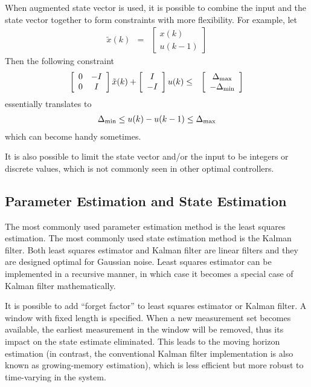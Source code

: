When augmented state vector is used, it is possible to combine the input and the state vector together to form constraints with more flexibility. For example, let
\begin{eqnarray}
	\tilde{x}(k) &=& \left[\begin{array}{c}
		x(k) \\ u(k-1)
	\end{array}\right] \nonumber
\end{eqnarray}
Then the following constraint
\begin{eqnarray}
	\left[\begin{array}{cc}
		0 & -I \\ 0 & I
	\end{array}\right]\tilde{x}(k) + \left[\begin{array}{c}
	I \\ -I
\end{array}\right]u(k) &\leq& \left[\begin{array}{c}
\Delta_{\textup{max}} \\ -\Delta_{\textup{min}}
\end{array}\right] \nonumber
\end{eqnarray}
essentially translates to
\begin{eqnarray}
	\Delta_{\textup{min}} \leq u(k) - u(k-1) \leq \Delta_{\textup{max}} \nonumber
\end{eqnarray}
which can become handy sometimes.

It is also possible to limit the state vector and/or the input to be integers or discrete values, which is not commonly seen in other optimal controllers.

\subsection{Parameter Estimation and State Estimation}

The most commonly used parameter estimation method is the least squares estimation. The most commonly used state estimation method is the Kalman filter. Both least squares estimator and Kalman filter are linear filters and they are designed optimal for Gaussian noise. Least squares estimator can be implemented in a recursive manner, in which case it becomes a special case of Kalman filter mathematically.

It is possible to add ``forget factor'' to least squares estimator or Kalman filter. A window with fixed length is specified. When a new measurement set becomes available, the earliest measurement in the window will be removed, thus its impact on the state estimate eliminated. This leads to the moving horizon estimation (in contrast, the conventional Kalman filter implementation is also known as growing-memory estimation), which is less efficient but more robust to time-varying in the system.


